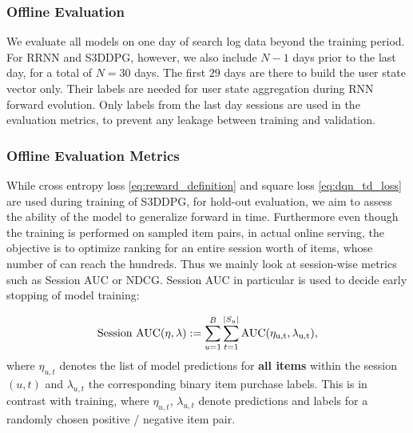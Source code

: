 \subsubsection{Offline Evaluation}
We evaluate all models on one day of search log data beyond the training period. For RRNN and S3DDPG, however, 
we also include $N-1$ days prior to the last day, for a total of $N = 30$ days. The first $29$ days are there to build the user state vector only. Their labels are needed for user state aggregation during RNN forward evolution. Only labels from the last day sessions are used in the evaluation metrics, to prevent any leakage between training and validation.

\subsubsection{Offline Evaluation Metrics}
While cross entropy loss \eqref{eq:reward_definition} and square loss \eqref{eq:dqn_td_loss} are used during training of S3DDPG, for hold-out evaluation, we aim to assess the ability of the model to generalize forward in time. Furthermore even though the training is performed on sampled item pairs, in actual online serving, the objective is to optimize ranking for an entire session worth of items, whose number of can reach the hundreds. Thus we mainly look at session-wise metrics such as Session AUC or NDCG. Session AUC in particular is used to decide early stopping of model training: 

\begin{align} \label{eq:session_auc}
    \text{Session AUC}(\eta, \lambda) := \sum_{u = 1}^B \sum_{t = 1}^{|S_u|} \rm{AUC}(\eta_{u, t}, \lambda_{u, t}),
\end{align}
where $\eta_{u, t}$ denotes the list of model predictions for \textbf{all items} within the session $(u, t)$ and $\lambda_{u, t}$ the corresponding binary item purchase labels. This is in contrast with training, where $\eta_{u, t}$, $\lambda_{u, t}$ denote predictions and labels for a randomly chosen positive / negative item pair. 

